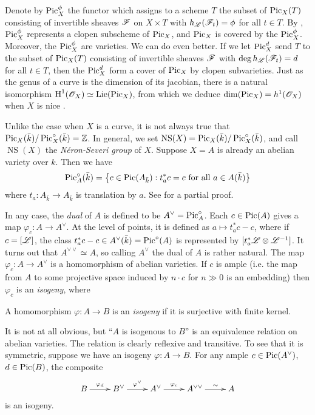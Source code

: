 \documentclass{article}
\begin{document}
Denote by 
$\operatorname{Pic}_X^\phi$ the functor which assigns to a scheme $T$ the subset of 
$\operatorname{Pic}_X(T)$ consisting of invertible sheaves $\mathscr{F}$ on $X\times T$ with 
$h_{\mathscr{L}}(\mathscr{F}_t) = \phi$ for all $t\in T$. By \cite[6.20]{kl05}, 
$\operatorname{Pic}_X^\phi$ represents a clopen subscheme of $\operatorname{Pic}_X$, and $\operatorname{Pic}_X$ is 
covered by the $\operatorname{Pic}_X^\phi$. Moreover, the $\operatorname{Pic}_X^\phi$ are varieties. We can 
do even better. If we let $\operatorname{Pic}_X^d$ send $T$ to the subset of $\operatorname{Pic}_X(T)$ 
consisting of invertible sheaves $\mathscr{F}$ with 
$\deg h_{\mathscr{L}}(\mathscr{F}_t) = d$ for all $t\in T$, then the 
$\operatorname{Pic}_X^d$ form a cover of $\operatorname{Pic}_X$ by clopen subvarieties. Just as the genus 
of a curve is the dimension of its jacobian, there is a natural isomorphism 
$\operatorname{H}^1(\mathscr{O}_X) \simeq \operatorname{Lie}(\operatorname{Pic}_X)$, from which we deduce 
$\dim(\operatorname{Pic}_X) = h^1(\mathscr{O}_X)$ when $X$ is nice \cite[5.11]{kl05}.

Unlike the case when $X$ is a curve, it is not always true that 
$\operatorname{Pic}_X(\bar k)/\operatorname{Pic}_X^\circ(\bar k) = \mathbb{Z}$. In general, we set 
$\operatorname{NS}(X) = \operatorname{Pic}_X(\bar k) / \operatorname{Pic}_X^\circ(\bar k)$, and call 
$\operatorname{NS}(X)$ the \emph{N\'eron-Severi group} of $X$. 
Suppose $X=A$ is already an abelian variety over $k$. Then we have 
\[
  \operatorname{Pic}_A^\circ(\bar k) = \left\{c\in \operatorname{Pic}(A_{\bar k}) : t_a^* c = c\text{ for all }a\in A(\bar k)\right\} 
\]
where $t_a:A_{\bar k}\to A_{\bar k}$ is translation by $a$. See 
\cite[I.8.4]{mi} for a partial proof. 


In any case, the \emph{dual} of $A$ is defined to be $A^\vee = \operatorname{Pic}_A^\circ$. 
Each $c\in \operatorname{Pic}(A)$ gives a map $\varphi_c:A\to A^\vee$. At the level of 
points, it is defined as $a\mapsto t_a^* c - c$, where if $c=[\mathscr{L}]$, 
the class $t_a^*c - c\in A^\vee(\bar k) = \operatorname{Pic}^\circ(A)$ is represented by 
$[t_a^*\mathscr{L}\otimes\mathscr{L}^{-1}]$. 
It turns out that $A^{\vee\vee} \simeq A$, so calling $A^\vee$ the dual of $A$ 
is rather natural. The map $\varphi_c:A\to A^\vee$ is a homomorphism of abelian 
varieties. If $c$ is ample (i.e. the map from $A$ to some projective space 
induced by $n\cdot c$ for $n\gg 0$ is an embedding) then $\varphi_c$ is an 
\emph{isogeny}, where 

\begin{definition}
A homomorphism $\varphi:A\to B$ is an \emph{isogeny} if it is surjective with 
finite kernel.
\end{definition}

It is not at all obvious, but ``$A$ is isogenous to $B$'' is an equivalence 
relation on abelian varieties. The relation is clearly reflexive and 
transitive. To see that it is symmetric, suppose we have an 
isogeny $\varphi:A\to B$. For any ample $c\in \operatorname{Pic}(A^\vee)$, $d\in \operatorname{Pic}(B)$, 
the composite 
\[\xymatrix{
  B \ar[r]^-{\varphi_d} 
    & B^\vee \ar[r]^-{\varphi^\vee} 
    & A^\vee \ar[r]^-{\varphi_c}
    & A^{\vee\vee} \ar[r]^-\sim 
    & A
}\]
is an isogeny. 
\end{document}
